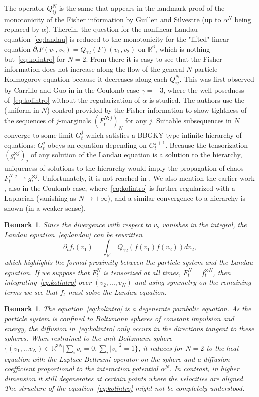 \documentclass[11pt,a4paper]{article}
\theoremstyle{definition}
\theoremstyle{plain}
\newtheorem{remark}[defi]{Remark}
\begin{document}
The operator $Q^N_{ij}$ is the same that appears in the landmark proof of the monotonicity of the Fisher information by Guillen and Silvestre \cite{GuillenSilvestre2023} (up to $\alpha^N$ being replaced by $\alpha$). Therein, the question for the nonlinear Landau equation~\eqref{eq:landau} is reduced to the monotonicity for the "lifted" linear equation $\partial_t F(v_1,v_2)=Q_{12}(F)(v_1,v_2)$ on $\mathbb{R}^6$, which is nothing but~\eqref{eq:kolintro} for $N=2$. From there it is easy to see that the Fisher information does not increase along the flow of the general $N$-particle Kolmogorov equation because it decreases along each $Q^N_{ij}$. This was first observed by Carrillo and Guo in \cite{CarrilloGuo2025} in the Coulomb case $\gamma=-3$, where the well-posedness of~\eqref{eq:kolintro} without the regularization of $\alpha$ is studied. The authors use the (uniform in $N$) control provided by the Fisher information to show tightness of the sequences of $j$-marginals $(F^{N:j}_t)_N$ for any $j$. Suitable subsequences in $N$ converge to some limit $G^j_t$ which satisfies a BBGKY-type infinite hierarchy of equations: $G^j_t$ obeys an equation depending on $G^{j+1}_t$. Because the tensorization $(g_t^{\otimes j})_j$ of any solution of the Landau equation is a solution to the hierarchy, uniqueness of solutions to the hierarchy would imply the propagation of chaos $F_t^{N:j}\rightharpoonup g_t^{\otimes j}$. Unfortunately, it is not reached in \cite{CarrilloGuo2025}. We also mention the earlier work \cite{MiotPulvirentiSaffirio2011}, also in the Coulomb case, where~\eqref{eq:kolintro} is further regularized with a Laplacian (vanishing as $N\rightarrow +\infty$), and a similar convergence to a hierarchy is shown (in a weaker sense).

\begin{remark}
Since the divergence with respect to $v_2$ vanishes in the integral, the Landau equation~\eqref{eq:landau} can be rewritten
$$\partial_t f_t(v_1)=\int_{\mathbb{R}^3}Q_{12}(f(v_1)f(v_2))dv_2,$$
which highlights the formal proximity between the particle system and the Landau equation. If we suppose that $F^N_t$ is tensorized at all times, $F^N_t=f_t^{\otimes N}$, then integrating~\eqref{eq:kolintro} over $(v_2,...,v_N)$ and using symmetry on the remaining terms we see that $f_t$ must solve the Landau equation.
\end{remark}

\begin{remark}
The equation~\eqref{eq:kolintro} is a degenerate parabolic equation. As the particle system is confined to Boltzmann spheres of constant impulsion and energy, the diffusion in~\eqref{eq:kolintro} only occurs in the directions tangent to these spheres. When restrained to the unit Boltzmann sphere $\{(v_1,...v_N)\in\mathbb{R}^{3N} \vert \sum_i v_i = 0, \sum_i \vert v_i \vert^2 =1\}$, it reduces for $N=2$ to the heat equation with the Laplace Beltrami operator on the sphere and a diffusion coefficient proportional to the interaction potential $\alpha^N$. In contrast, in higher dimension it still degenerates at certain points where the velocities are aligned. The structure of the equation~\eqref{eq:kolintro} might not be completely understood.
\end{remark}
\end{document}
